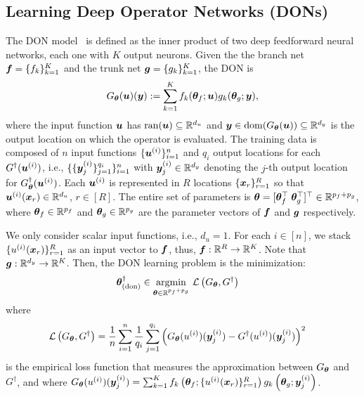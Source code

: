 \subsection{Learning Deep Operator Networks (DONs)}
\label{subsec:DON_Setup} 
%
The DON model~\citep{lu20201DeepONet} is defined as the inner product of two deep feedforward neural networks, each one with $K$ output neurons. Given the 
the branch net ${\bm{f}} = \{f_k\}_{k=1}^{K}$ and {the trunk net}  ${\bm{g}} = \{g_k\}_{k=1}^{K}$, the DON is 
\begin{equation}
    G_{{\bm{\theta}}}({\bm{u}})({\bm{y}}) := \sum_{k=1}^K f_k({\bm{\theta}}_f;{\bm{u}}) g_k({\bm{\theta}}_g;{\bm{y}}),
    \label{eq:DONoutput}
\end{equation}
where the input function ${\bm{u}}$ has $\operatorname{ran}({\bm{u}})\subseteq{\mathbb{R}}^{d_u}$ 
and ${\bm{y}} \in {\mathrm{dom}} (G_{{\bm{\theta}}}({\bm{u}}))\subseteq {\mathbb{R}}^{d_y}$ is the output location on which the operator is evaluated. 
The training data is composed of $n$ input functions $\{{\bm{u}}^{(i)}\}_{i=1}^n$ and $q_i$ output locations for each $G^\dagger({\bm{u}}^{(i)})$, i.e., $ \{\{{\bm{y}}^{(i)}_j\}_{j=1}^{q_i}\}_{i=1}^n$ with ${\bm{y}}^{(i)}_j\in{\mathbb{R}}^{d_y}$ denoting the $j$-th output location for $G^\dagger_{{\bm{\theta}}}({\bm{u}}^{(i)})$. 
Each ${\bm{u}}^{(i)}$ is represented in $R$ locations $\{\boldsymbol{x}_r\}_{r=1}^{R}$
so that ${\bm{u}}^{(i)}(\boldsymbol{x}_r)\in{\mathbb{R}}^{d_u}$, $r\in [R]$. 
% 
%
The entire set of parameters is ${\bm{\theta}} = [{\bm{\theta}}_f^{\top}\;{\bm{\theta}}_g^{\top}]^\top \in {\mathbb{R}}^{p_f+p_g}$, where ${\bm{\theta}}_f\in {\mathbb{R}}^{p_f}$ and ${\bm{\theta}}_g\in{\mathbb{R}}^{p_g}$ are the parameter vectors of ${\bm{f}}$ and ${\bm{g}}$ respectively. 

We only consider scalar input functions, i.e., 
$d_u = 1$.  
For each $i\in[n]$, we stack $\{u^{(i)}({\bm{x}}_r)\}_{r=1}^R$ as an input vector to ${\bm{f}}$, thus, ${\bm{f}}:{\mathbb{R}}^R\to {\mathbb{R}}^K$. Note that ${\bm{g}}:{\mathbb{R}}^{d_y}\to{\mathbb{R}}^K$. Then, the DON learning problem is %
the minimization: 
\begin{align}
    \begin{aligned}
        {\bm{\theta}}^\dagger_{\rm (don)} &\in 
    \underset{{\bm{\theta}}\in{\mathbb{R}}^{p_f+p_g}}{\operatorname{argmin}}~
    {\mathcal{L}}\left(G_{{\bm{\theta}}}, G^{\dagger}\right)
    \label{eq:empirical_risk}
    \end{aligned}
\end{align}
where 
\begin{equation}
\label{eq:loss-don}
\begin{aligned}
&{\mathcal{L}}\left(G_{{\bm{\theta}}}, G^{\dagger}\right)= \frac{1}{n}\sum_{i=1}^n \frac{1}{q_i} \sum_{j=1}^{q_i} 
    \left(
        G_{{\bm{\theta}}}(u^{(i)})({\bm{y}}^{(i)}_j) - G^{\dagger}(u^{(i)})({\bm{y}}^{(i)}_j) 
    \right)^2
\end{aligned}
\end{equation}
is the empirical loss function that measures the approximation between $G_{{\bm{\theta}}}$ and $G^\dagger$, and where
$G_{{\bm{\theta}}}(u^{(i)})({\bm{y}}^{(i)}_j)=\sum_{k=1}^K f_k\left({\bm{\theta}}_f;\{u^{(i)}({\bm{x}}_r)\}_{r=1}^R\right) g_k\left({\bm{\theta}}_g;{\bm{y}}^{(i)}_j\right)$.

